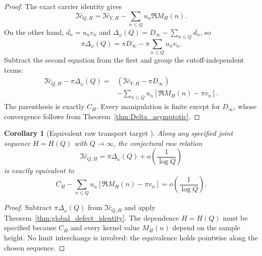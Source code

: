 \documentclass[11pt]{amsart}
\numberwithin{equation}{section}
\theoremstyle{plain}
\newtheorem{corollary}[theorem]{Corollary}
\theoremstyle{definition}
\theoremstyle{remark}
\newcommand{\1}{\mathbf{1}}
\begin{document}
\begin{proof}
The exact carrier identity gives
\begin{equation}
\Im\widehat c_{Q,H}
=
\Im\widehat c_{Y,H}
-
\sum_{n\leq Q}u_n\Re M_H(n).
\label{eq:global_defect_proof_carrier}
\end{equation}
On the other hand, \(d_n=u_nv_n\) and
\(\Delta_\omega(Q)=D_\infty-\sum_{n\leq Q}d_n\), so
\begin{equation}
\pi\Delta_\omega(Q)
=
\pi D_\infty
-
\pi\sum_{n\leq Q}u_nv_n.
\label{eq:global_defect_proof_Delta}
\end{equation}
Subtract the second equation from the first and group the cutoff-independent
terms:
\begin{align}
\Im\widehat c_{Q,H}-\pi\Delta_\omega(Q)
={}&
\left(\Im\widehat c_{Y,H}-\pi D_\infty\right)
\label{eq:global_defect_proof_group_one}
\\
&-
\sum_{n\leq Q}u_n
\left[\Re M_H(n)-\pi v_n\right].
\label{eq:global_defect_proof_group_two}
\end{align}
The parenthesis is exactly \(C_H\).  Every manipulation is finite except
for \(D_\infty\), whose convergence follows from
Theorem~\ref{thm:Delta_asymptotic}.
\end{proof}


\begin{corollary}[Equivalent raw transport target {}]
\label{cor:transport_target}
Along any specified joint sequence \(H=H(Q)\) with \(Q\to\infty\), the
conjectural raw relation
\begin{equation}
\Im\widehat c_{Q,H}
=
\pi\Delta_\omega(Q)
+
o\left(\frac1{\log Q}\right)
\label{eq:transport_relation}
\end{equation}
is exactly equivalent to
\begin{equation}
\boxed{
C_H
-
\sum_{n\leq Q}
u_n\left[
\Re M_H(n)-\pi v_n
\right]
=
o\left(\frac1{\log Q}\right).
}
\label{eq:equivalent_transport_target}
\end{equation}
\end{corollary}

\begin{proof}
Subtract \(\pi\Delta_\omega(Q)\) from
\(\Im\widehat c_{Q,H}\) and apply
Theorem~\ref{thm:global_defect_identity}.  The dependence
\(H=H(Q)\) must be specified because \(C_H\) and every kernel value
\(M_H(n)\) depend on the sample height.  No limit interchange is involved:
the equivalence holds pointwise along the chosen sequence.
\end{proof}
\end{document}
